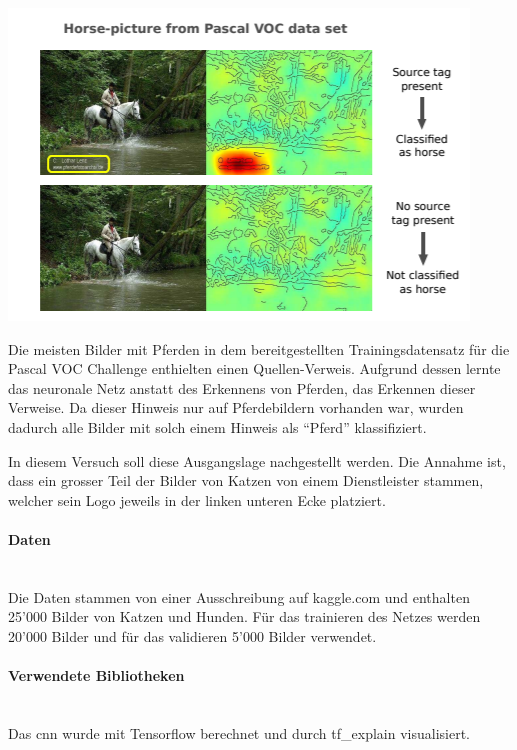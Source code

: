 \documentclass[
  12pt, %
  a4paper, %
  oneside, %
  openany, 
  numbers=noenddot, %
  BCOR=5mm, %
  parskip=half*, %
  thesis, %
]{bfhbook}
\newcommand{\parag}[1]{\paragraph*{#1}\mbox{}\\}
\begin{document}
\begin{center}
\begin{minipage}[t]{0.45\linewidth}
\vspace{0pt}
\includegraphics[width=\linewidth]{Bilder/HorsePredictionPascalVOC.PNG}
\end{minipage}\hfill
\begin{minipage}[t]{0.45\linewidth}
\vspace{20pt}
Die meisten Bilder mit Pferden in dem bereitgestellten Trainingsdatensatz für die Pascal VOC Challenge enthielten einen Quellen-Verweis. Aufgrund dessen lernte das neuronale Netz anstatt des Erkennens von  Pferden, das Erkennen dieser Verweise. Da dieser Hinweis nur auf Pferdebildern vorhanden war, wurden dadurch alle Bilder mit solch einem Hinweis als ``Pferd'' klassifiziert.
\end{minipage}
\end{center}

\break
In diesem Versuch soll diese Ausgangslage nachgestellt werden. Die Annahme ist, dass ein grosser Teil der Bilder von Katzen von einem Dienstleister stammen, welcher sein Logo jeweils in der linken unteren Ecke platziert. 

\parag{Daten}
Die Daten stammen von einer Ausschreibung auf kaggle.com \cite{kaggleDogCats} und enthalten 25'000 Bilder von Katzen und Hunden. Für das trainieren des Netzes werden 20'000 Bilder und für das validieren 5'000 Bilder verwendet.

\parag{Verwendete Bibliotheken}
Das \Gls{cnn} wurde mit Tensorflow \cite{TensorFlow} berechnet und durch tf\_explain \cite{tfExplain} visualisiert.
\end{document}
